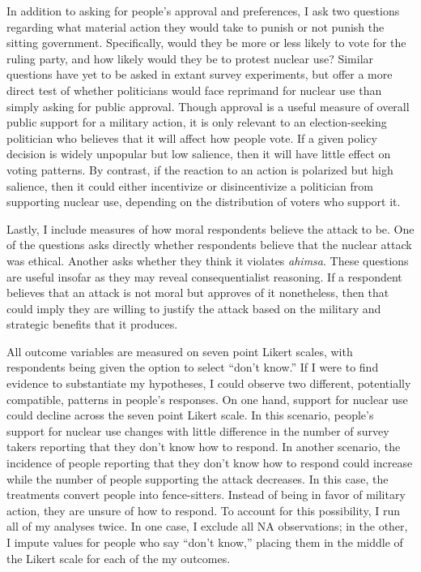 \documentclass[12pt]{article}
\begin{document}
In addition to asking for people's approval and preferences, I ask two questions regarding what material action they would take to punish or not punish the sitting government. Specifically, would they be more or less likely to vote for the ruling party, and how likely would they be to protest nuclear use? Similar questions have yet to be asked in extant survey experiments, but offer a more direct test of whether politicians would face reprimand for nuclear use than simply asking for public approval. Though approval is a useful measure of overall public support for a military action, it is only relevant to an election-seeking politician who believes that it will affect how people vote. If a given policy decision is widely unpopular but low salience, then it will have little effect on voting patterns. By contrast, if the reaction to an action is polarized but high salience, then it could either incentivize or disincentivize a politician from supporting nuclear use, depending on the distribution of voters who support it. 

Lastly, I include measures of how moral respondents believe the attack to be. One of the questions asks directly whether respondents believe that the nuclear attack was ethical. Another asks whether they think it violates \textit{ahimsa}. These questions are useful insofar as they may reveal consequentialist reasoning. If a respondent believes that an attack is not moral but approves of it nonetheless, then that could imply they are willing to justify the attack based on the military and strategic benefits that it produces.

All outcome variables are measured on seven point Likert scales, with respondents being given the option to select “don't know.” If I were to find evidence to substantiate my hypotheses, I could observe two different, potentially compatible, patterns in people's responses. On one hand, support for nuclear use could decline across the seven point Likert scale. In this scenario, people's support for nuclear use changes with little difference in the number of survey takers reporting that they don't know how to respond. In another scenario, the incidence of people reporting that they don't know how to respond could increase while the number of people supporting the attack decreases. In this case, the treatments convert people into fence-sitters. Instead of being in favor of military action, they are unsure of how to respond. To account for this possibility, I run all of my analyses twice. In one case, I exclude all NA observations; in the other, I impute values for people who say “don't know,” placing them in the middle of the Likert scale for each of the my outcomes.
\end{document}
